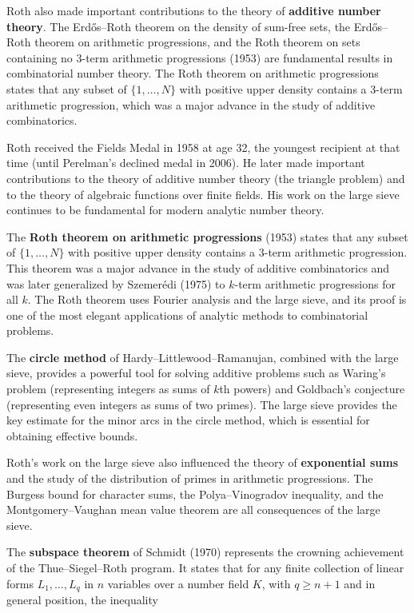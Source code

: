 Roth also made important contributions to the theory of \textbf{additive number
theory}. The Erd{\H{o}}s--Roth theorem on the density of sum-free sets, the
Erd{\H{o}}s--Roth theorem on arithmetic progressions, and the Roth theorem on
sets containing no 3-term arithmetic progressions (1953) are fundamental
results in combinatorial number theory. The Roth theorem on arithmetic
progressions states that any subset of $\{1, \ldots, N\}$ with positive upper
density contains a 3-term arithmetic progression, which was a major advance in
the study of additive combinatorics.

Roth received the Fields Medal in 1958 at age 32, the youngest recipient at
that time (until Perelman's declined medal in 2006). He later made important
contributions to the theory of additive number theory (the triangle problem)
and to the theory of algebraic functions over finite fields. His work on the
large sieve continues to be fundamental for modern analytic number theory.

The \textbf{Roth theorem on arithmetic progressions} (1953) states that any
subset of $\{1, \ldots, N\}$ with positive upper density contains a 3-term
arithmetic progression. This theorem was a major advance in the study of
additive combinatorics and was later generalized by Szemer\'edi (1975) to
$k$-term arithmetic progressions for all $k$. The Roth theorem uses Fourier
analysis and the large sieve, and its proof is one of the most elegant
applications of analytic methods to combinatorial problems.

The \textbf{circle method} of Hardy--Littlewood--Ramanujan, combined with the
large sieve, provides a powerful tool for solving additive problems such as
Waring's problem (representing integers as sums of $k$th powers) and
Goldbach's conjecture (representing even integers as sums of two primes). The
large sieve provides the key estimate for the minor arcs in the circle
method, which is essential for obtaining effective bounds.

Roth's work on the large sieve also influenced the theory of \textbf{exponential
sums} and the study of the distribution of primes in arithmetic progressions.
The Burgess bound for character sums, the Polya--Vinogradov inequality, and
the Montgomery--Vaughan mean value theorem are all consequences of the large
sieve.

The \textbf{subspace theorem} of Schmidt (1970) represents the crowning
achievement of the Thue--Siegel--Roth program. It states that for any finite
collection of linear forms $L_1, \ldots, L_q$ in $n$ variables over a number
field $K$, with $q \geq n+1$ and in general position, the inequality

